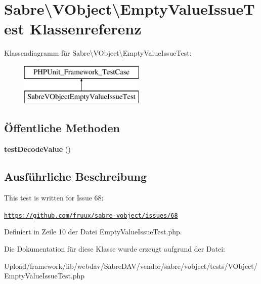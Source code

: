 \hypertarget{class_sabre_1_1_v_object_1_1_empty_value_issue_test}{}\section{Sabre\textbackslash{}V\+Object\textbackslash{}Empty\+Value\+Issue\+Test Klassenreferenz}
\label{class_sabre_1_1_v_object_1_1_empty_value_issue_test}
Klassendiagramm für Sabre\textbackslash{}V\+Object\textbackslash{}Empty\+Value\+Issue\+Test\+:\begin{figure}[H]
\begin{center}
\leavevmode
\includegraphics[height=2.000000cm]{class_sabre_1_1_v_object_1_1_empty_value_issue_test}
\end{center}
\end{figure}
\subsection*{Öffentliche Methoden}
\begin{DoxyCompactItemize}
\item 
\mbox{\label{class_sabre_1_1_v_object_1_1_empty_value_issue_test_a8d168c2aca6f17fbab36831936a6c91a}} 
{\bfseries test\+Decode\+Value} ()
\end{DoxyCompactItemize}


\subsection{Ausführliche Beschreibung}
This test is written for Issue 68\+:

\href{https://github.com/fruux/sabre-vobject/issues/68}{\tt https\+://github.\+com/fruux/sabre-\/vobject/issues/68} 

Definiert in Zeile 10 der Datei Empty\+Value\+Issue\+Test.\+php.



Die Dokumentation für diese Klasse wurde erzeugt aufgrund der Datei\+:\begin{DoxyCompactItemize}
\item 
Upload/framework/lib/webdav/\+Sabre\+D\+A\+V/vendor/sabre/vobject/tests/\+V\+Object/Empty\+Value\+Issue\+Test.\+php\end{DoxyCompactItemize}
